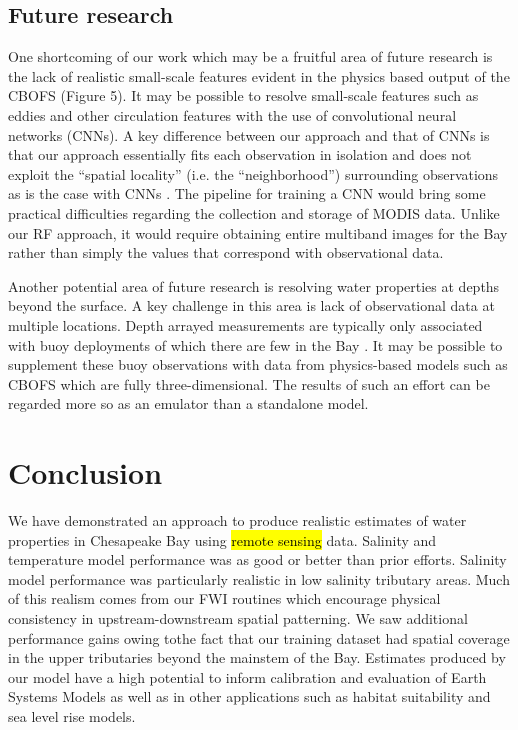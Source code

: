 \documentclass{article}
\begin{document}
\subsection{Future research}

One shortcoming of our work which may be a fruitful area of future research is the lack of realistic small-scale features evident in the physics based output of the CBOFS (Figure 5). It may be possible to resolve small-scale features such as eddies and other circulation features with the use of convolutional neural networks (CNNs). A key difference between our approach and that of CNNs is that our approach essentially fits each observation in isolation and does not exploit the “spatial locality” (i.e. the “neighborhood”) surrounding observations as is the case with CNNs \cite{goodfellow2016convolutional}. The pipeline for training a CNN would bring some practical difficulties regarding the collection and storage of MODIS data. Unlike our RF approach, it would require obtaining entire multiband images for the Bay rather than simply the values that correspond with observational data.

Another potential area of future research is resolving water properties at depths beyond the surface. A key challenge in this area is lack of observational data at multiple locations. Depth arrayed measurements are typically only associated with buoy deployments of which there are few in the Bay \cite{vogelAssessingSatelliteSea2016}. It may be possible to supplement these buoy observations with data from physics-based models such as CBOFS which are fully three-dimensional. The results of such an effort can be regarded more so as an emulator than a standalone model.


\section{Conclusion}

We have demonstrated an approach to produce realistic estimates of water properties in Chesapeake Bay using \hl{remote sensing} data. Salinity and temperature model performance was as good or better than prior efforts. Salinity model performance was particularly realistic in low salinity tributary areas. Much of this realism comes from our FWI routines which encourage physical consistency in upstream-downstream spatial patterning. We saw additional performance gains owing tothe fact that our training dataset had spatial coverage in the upper tributaries beyond the mainstem of the Bay. Estimates produced by our model have a high potential to inform calibration and evaluation of Earth Systems Models as well as in other applications such as habitat suitability and sea level rise models.
\end{document}
